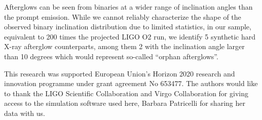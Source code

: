 \documentclass[11pt]{article}
\begin{document}
Afterglows can be seen from binaries at a wider range of inclination angles than
the prompt emission. While we cannot reliably characterize the shape of the
observed binary inclination distribution due to limited statistics, in our
sample, equivalent to 200 times the projected LIGO O2 run, we identify 5
synthetic hard X-ray afterglow counterparts, among them 2 with the inclination
angle larger than 10 degrees which would represent so-called ``orphan
afterglows''.

\vspace{3mm}


{\linespread{0.1} \footnotesize \noindent This research was supported European
  Union's Horizon 2020 research and innovation programme under grant agreement
  No 653477. The authors would like to thank the LIGO Scientific Collaboration
  and Virgo Collaboration for giving access to the simulation software used
  here, Barbara Patricelli for sharing her data with us.}


\vspace*{-5mm}
{\footnotesize
}
\end{document}
